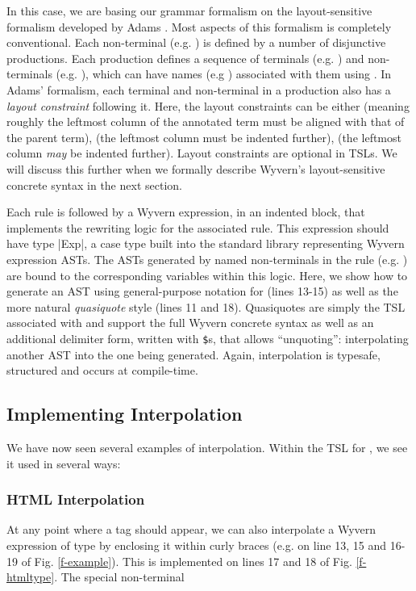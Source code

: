 In this case, we are basing our grammar formalism on the layout-sensitive formalism developed by Adams \cite{Adams:2013:PPI:2429069.2429129}. Most aspects of this formalism is completely conventional. 
Each non-terminal (e.g. ) is defined by a number of disjunctive productions. Each production defines a sequence of terminals (e.g. ) and non-terminals (e.g. ), which can have names (e.g ) associated with them using \li{::}. In Adams' formalism, each terminal and non-terminal in a production also has a \emph{layout constraint} following it. Here, the layout constraints can be either \li{=} (meaning roughly the leftmost column of the annotated term must be aligned with that of the parent term), \li{>} (the leftmost column must be indented further), \li{>=} (the leftmost column \emph{may} be indented further). Layout constraints are optional in TSLs. We will discuss this further when we formally describe Wyvern's layout-sensitive concrete syntax in the next section.

Each rule is followed by a Wyvern expression, in an indented block, that implements the rewriting logic for the associated rule. This expression should have type \li|Exp|, a case type built into the standard library representing Wyvern expression ASTs. The ASTs generated by named non-terminals in the rule (e.g. ) are bound to the corresponding variables within this logic. Here, we show how to generate an AST using general-purpose notation for  (lines 13-15) as well as the more natural \emph{quasiquote} style (lines 11 and 18). Quasiquotes are simply the TSL associated with  and support the full Wyvern concrete syntax as well as an additional delimiter form, written with \verb|$|s, that allows ``unquoting'': interpolating another AST into the one being generated. Again, interpolation is typesafe, structured and occurs at compile-time.

\subsection{Implementing Interpolation}
We have now seen several examples of interpolation. Within the TSL for , we see it used in several ways:

\subsubsection{HTML Interpolation} At any point where a tag should appear, we can also interpolate a Wyvern expression of type  by enclosing it within curly braces (e.g. on line 13, 15 and 16-19 of Fig. \ref{f-example}). This is implemented on lines 17 and 18 of Fig. \ref{f-htmltype}. The special non-terminal %

